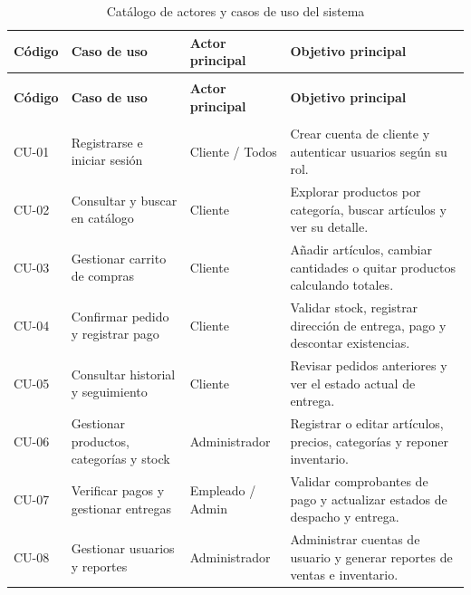 {\small
\begin{xltabular}{\textwidth}{|>{\raggedright\arraybackslash}p{1.6cm}|>{\raggedright\arraybackslash}p{4.4cm}|>{\raggedright\arraybackslash}p{2.6cm}|X|}
    \caption{Catálogo de actores y casos de uso del sistema}
    \label{tab:actores_casos_uso} \\
    \hline
    \textbf{Código} & \textbf{Caso de uso} & \textbf{Actor principal} & \textbf{Objetivo principal} \\
    \hline
    \endfirsthead

     \\
    \hline
    \textbf{Código} & \textbf{Caso de uso} & \textbf{Actor principal} & \textbf{Objetivo principal} \\
    \hline
    \endhead

     \\
    \endfoot

    \endlastfoot

    CU-01 & Registrarse e iniciar sesión & Cliente / Todos & Crear cuenta de cliente y autenticar usuarios según su rol. \\*
    \hline
    CU-02 & Consultar y buscar en catálogo & Cliente & Explorar productos por categoría, buscar artículos y ver su detalle. \\*
    \hline
    CU-03 & Gestionar carrito de compras & Cliente & Añadir artículos, cambiar cantidades o quitar productos calculando totales. \\*
    \hline
    CU-04 & Confirmar pedido y registrar pago & Cliente & Validar stock, registrar dirección de entrega, pago y descontar existencias. \\*
    \hline
    CU-05 & Consultar historial y seguimiento & Cliente & Revisar pedidos anteriores y ver el estado actual de entrega. \\*
    \hline
    CU-06 & Gestionar productos, categorías y stock & Administrador & Registrar o editar artículos, precios, categorías y reponer inventario. \\*
    \hline
    CU-07 & Verificar pagos y gestionar entregas & Empleado / Admin & Validar comprobantes de pago y actualizar estados de despacho y entrega. \\*
    \hline
    CU-08 & Gestionar usuarios y reportes & Administrador & Administrar cuentas de usuario y generar reportes de ventas e inventario. \\
    \hline
\end{xltabular}
}

